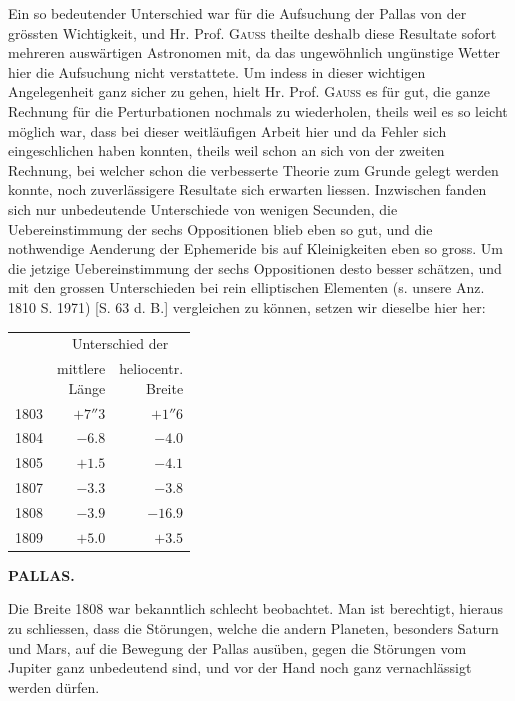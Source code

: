 \par\indent Ein so bedeutender Unterschied war für die Aufsuchung der Pallas von der grössten Wichtigkeit, und Hr. Prof. \textsc{Gauss} theilte deshalb diese Resultate sofort mehreren auswärtigen Astronomen mit, da das ungewöhnlich ungünstige Wetter hier die Aufsuchung nicht verstattete. Um indess in dieser wichtigen Angelegenheit ganz sicher zu gehen, hielt Hr. Prof. \textsc{Gauss} es für gut, die ganze Rechnung für die Perturbationen nochmals zu wiederholen, theils weil es so leicht möglich war, dass bei dieser weitläufigen Arbeit hier und da Fehler sich eingeschlichen haben konnten, theils weil schon an sich von der zweiten Rechnung, bei welcher schon die verbesserte Theorie zum Grunde gelegt werden konnte, noch zuverlässigere Resultate sich erwarten liessen. Inzwischen fanden sich nur unbedeutende Unterschiede von wenigen Secunden, die Uebereinstimmung der sechs Oppositionen blieb eben so gut, und die nothwendige Aenderung der Ephemeride bis auf Kleinigkeiten eben so gross. Um die jetzige Uebereinstimmung der sechs Oppositionen desto besser schätzen, und mit den grossen Unterschieden bei rein elliptischen Elementen (s. unsere Anz. 1810 S. 1971) [S. 63 d. B.] vergleichen zu können, setzen wir dieselbe hier her:
\begin{center}\fontsize{10}{12}\selectfont\setlength{\tabcolsep}{4pt}\renewcommand{\arraystretch}{1.15}\begin{tabular}{r|r|r}
 & \multicolumn{2}{c}{Unterschied der}\\
 & \shortstack{mittlere\\Länge} & \shortstack{heliocentr.\\Breite}\\\hline
1803 & $+7''3$ & $+1''6$\\
1804 & $-6.8$ & $-4.0$\\
1805 & $+1.5$ & $-4.1$\\
1807 & $-3.3$ & $-3.8$\\
1808 & $-3.9$ & $-16.9$\\
1809 & $+5.0$ & $+3.5$\\
\end{tabular}\end{center}

\clearpage
\thispagestyle{empty}
\noindent{}%
%
\parbox[t]{\dimexpr\linewidth-24mm\relax}{\centering\footnotesize\bfseries PALLAS.\par}%
\makebox[12mm][r]{}\par\nobreak\medskip
\par\indent Die Breite 1808 war bekanntlich schlecht beobachtet. Man ist berechtigt, hieraus zu schliessen, dass die Störungen, welche die andern Planeten, besonders Saturn und Mars, auf die Bewegung der Pallas ausüben, gegen die Störungen vom Jupiter ganz unbedeutend sind, und vor der Hand noch ganz vernachlässigt werden dürfen.

